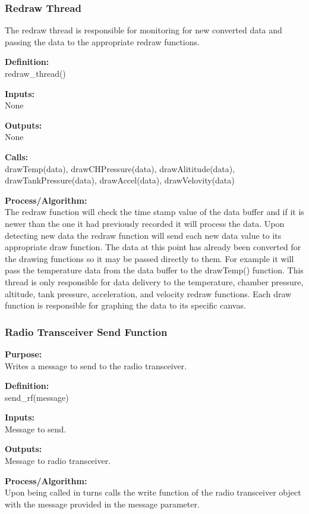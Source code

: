 \documentclass[10pt,draftclsnofoot,onecolumn,retainorgcmds]{IEEEtran}
\begin{document}
\subsubsection{Redraw Thread}
The redraw thread is responsible for monitoring for new converted data and passing the data to the appropriate redraw functions.\par
{\bf Definition:} \\
redraw\_thread() \par
{\bf Inputs:} \\  None \par
{\bf Outputs:} \\ None \par
{\bf Calls:} \\ drawTemp(data), drawCHPressure(data), drawAlititude(data), drawTankPressure(data), drawAccel(data), drawVelovity(data) \par
{\bf Process/Algorithm:} \\
The redraw function will check the time stamp value of the data buffer and if it is newer than the one it had previously recorded it will process the data. Upon detecting new data the redraw function will send each new data value to its appropriate draw function. The data at this point has already been converted for the drawing functions so it may be passed directly to them. For example it will pass the temperature data from the data buffer to the drawTemp() function. This thread is only responsible for data delivery to the temperature, chamber pressure, altitude, tank pressure, acceleration, and velocity redraw functions. Each draw function is responsible for graphing the data to its specific canvas.\par
\subsubsection{Radio Transceiver Send Function}
{\bf Purpose:} \\
Writes a message to send to the radio transceiver. \par
{\bf Definition:} \\ 
send\_rf(message) \par
{\bf Inputs:} \\  Message to send. \par
{\bf Outputs:} \\ Message to radio transceiver. \par
{\bf Process/Algorithm:} \\
Upon being called in turns calls the write function of the radio transceiver object with the message provided in the message parameter. \par
\end{document}
